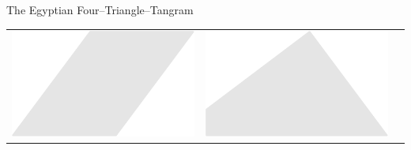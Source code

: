 \documentclass[14pt]{beamer}
\begin{document}
\begin{frame}{The Egyptian Four--Triangle--Tangram}
\begin{center}
\begin{tabular}{ccc}
                \;\;\includegraphics[scale=0.3]{figures/figure023g.pdf} \;\;&
                \;\;\includegraphics[scale=0.3]{figures/figure023i.pdf} \\
            \end{tabular}

            \bigskip\bigskip
        \end{center}
    \end{frame}

\end{document}
